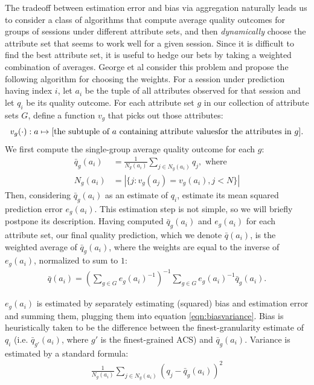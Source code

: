 \label{prediction}
The tradeoff between estimation error and bias via aggregation naturally leads us to consider a class of algorithms that compute average quality outcomes for groups of sessions under different attribute sets, and then {\it dynamically} choose the attribute set that seems to work well for a given session.  Since it is difficult to find the best attribute set, it is useful to hedge our bets by taking a weighted combination of averages.  George et al \cite{george2008value} consider this problem and propose the following algorithm for choosing the weights.  For a session under prediction having index $i$, let $a_i$ be the tuple of all attributes observed for that session and let $q_i$ be its quality outcome.  For each attribute set $g$ in our collection of attribute sets $G$, define a function $v_g$ that picks out those attributes:
\begin{equation*}
  v_g(\cdot): a \mapsto \text{[the subtuple of $a$ containing attribute values} \\
  \text{for the attributes in $g$]} .
\end{equation*}
We first compute the single-group average quality outcome for each $g$:
\begin{align*}
  \bar{q}_{g}(a_i) &= \frac{1}{N_{g}(a_i)} \sum_{j \in N_{g}(a_i)} q_j, \text{ where} \\
  N_{g}(a_i) &= |\{j: v_g(a_j) = v_g(a_i), j < N\}|
\end{align*}
Then, considering $\bar{q}_{g}(a_i)$ as an estimate of $q_i$, estimate its mean squared prediction error $e_{g}(a_i)$.  This estimation step is not simple, so we will briefly postpone its description.  Having computed $\bar{q}_{g}(a_i)$ and $e_{g}(a_i)$ for each attribute set, our final quality prediction, which we denote $\bar{q}(a_i)$, is the weighted average of $\bar{q}_{g}(a_i)$, where the weights are equal to the inverse of $e_{g}(a_i)$, normalized to sum to $1$:
\begin{align*}
  \bar{q}(a_i) = (\sum_{g \in G} e_{g}(a_i)^{-1})^{-1} \sum_{g \in G} e_{g}(a_i)^{-1} \bar{q}_{g}(a_i) .
\end{align*}

$e_{g}(a_i)$ is estimated by separately estimating (squared) bias and estimation error and summing them, plugging them into equation \eqref{eqn:biasvariance}.  Bias is heuristically taken to be the difference between the finest-granularity estimate of $q_i$ (i.e. $\bar{q}_{g'}(a_i)$, where $g'$ is the finest-grained ACS) and $\bar{q}_{g}(a_i)$.  Variance is estimated by a standard formula:
\begin{align*}
  \frac{1}{N_{g}(a_i)} \sum_{j \in N_{g}(a_i)} (q_j - \bar{q}_{g}(a_i))^2
\end{align*}

